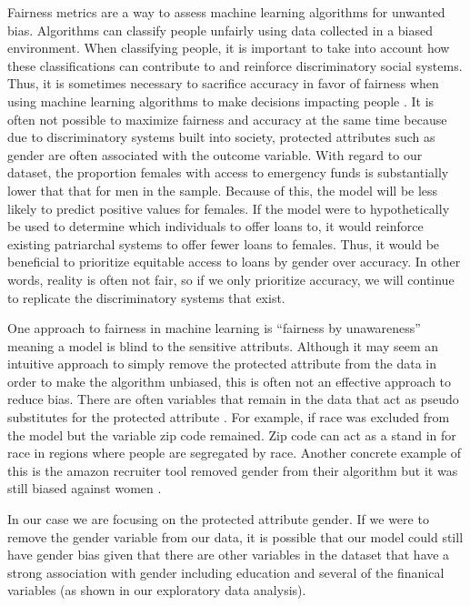 \documentclass[water,article,submit,moreauthors,pdftex]{mdpi}
\begin{document}
Fairness metrics are a way to assess machine learning algorithms for
unwanted bias. Algorithms can classify people unfairly using data
collected in a biased environment. When classifying people, it is
important to take into account how these classifications can contribute
to and reinforce discriminatory social systems. Thus, it is sometimes
necessary to sacrifice accuracy in favor of fairness when using machine
learning algorithms to make decisions impacting people
\citep[\citet{kamiran2012data},
\citet{menon2018cost}]{zliobaite2015relation}. It is often not possible
to maximize fairness and accuracy at the same time because due to
discriminatory systems built into society, protected attributes such as
gender are often associated with the outcome variable. With regard to
our dataset, the proportion females with access to emergency funds is
substantially lower that that for men in the sample. Because of this,
the model will be less likely to predict positive values for females. If
the model were to hypothetically be used to determine which individuals
to offer loans to, it would reinforce existing patriarchal systems to
offer fewer loans to females. Thus, it would be beneficial to prioritize
equitable access to loans by gender over accuracy. In other words,
reality is often not fair, so if we only prioritize accuracy, we will
continue to replicate the discriminatory systems that exist.

One approach to fairness in machine learning is ``fairness by
unawareness'' meaning a model is blind to the sensitive attributs.
Although it may seem an intuitive approach to simply remove the
protected attribute from the data in order to make the algorithm
unbiased, this is often not an effective approach to reduce bias. There
are often variables that remain in the data that act as pseudo
substitutes for the protected attribute \citep{zhou2022bias}. For
example, if race was excluded from the model but the variable zip code
remained. Zip code can act as a stand in for race in regions where
people are segregated by race. Another concrete example of this is the
amazon recruiter tool removed gender from their algorithm but it was
still biased against women \citep{goodman_2022}.

In our case we are focusing on the protected attribute gender. If we
were to remove the gender variable from our data, it is possible that
our model could still have gender bias given that there are other
variables in the dataset that have a strong association with gender
including education and several of the finanical variables (as shown in
our exploratory data analysis).
\end{document}
